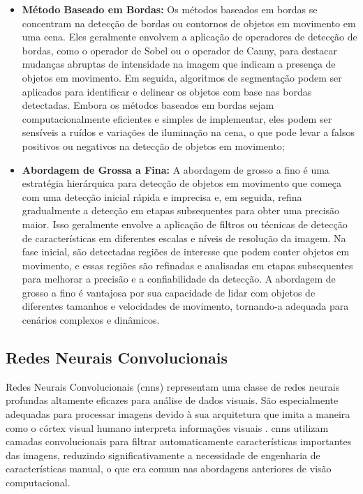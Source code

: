 \begin{itemize}
    \item \textbf{Método Baseado em Bordas:} Os métodos baseados em bordas se concentram na detecção de bordas ou contornos de objetos em movimento em uma cena. Eles geralmente envolvem a aplicação de operadores de detecção de bordas, como o operador de Sobel ou o operador de Canny, para destacar mudanças abruptas de intensidade na imagem que indicam a presença de objetos em movimento. Em seguida, algoritmos de segmentação podem ser aplicados para identificar e delinear os objetos com base nas bordas detectadas. Embora os métodos baseados em bordas sejam computacionalmente eficientes e simples de implementar, eles podem ser sensíveis a ruídos e variações de iluminação na cena, o que pode levar a falsos positivos ou negativos na detecção de objetos em movimento;
    \item \textbf{Abordagem de Grossa a Fina:} A abordagem de grosso a fino é uma estratégia hierárquica para detecção de objetos em movimento que começa com uma detecção inicial rápida e imprecisa e, em seguida, refina gradualmente a detecção em etapas subsequentes para obter uma precisão maior. Isso geralmente envolve a aplicação de filtros ou técnicas de detecção de características em diferentes escalas e níveis de resolução da imagem. Na fase inicial, são detectadas regiões de interesse que podem conter objetos em movimento, e essas regiões são refinadas e analisadas em etapas subsequentes para melhorar a precisão e a confiabilidade da detecção. A abordagem de grosso a fino é vantajosa por sua capacidade de lidar com objetos de diferentes tamanhos e velocidades de movimento, tornando-a adequada para cenários complexos e dinâmicos.
\end{itemize}

 \subsection{Redes Neurais Convolucionais}\label{subsec:cnns}
 
Redes Neurais Convolucionais (\gls{cnn}s) representam uma classe de redes neurais profundas altamente eficazes para análise de dados visuais. São especialmente adequadas para processar imagens devido à sua arquitetura que imita a maneira como o córtex visual humano interpreta informações visuais \cite{lecun1998gradient}. \gls{cnn}s utilizam camadas convolucionais para filtrar automaticamente características importantes das imagens, reduzindo significativamente a necessidade de engenharia de características manual, o que era comum nas abordagens anteriores de visão computacional.

